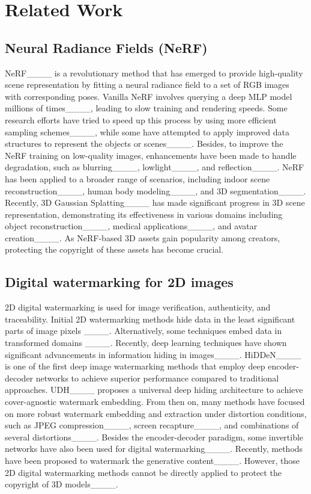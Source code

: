 \section{Related Work}
\subsection{Neural Radiance Fields (NeRF)}
NeRF____ is a revolutionary method that has emerged to provide high-quality scene representation by fitting a neural radiance field to a set of RGB images with corresponding poses. Vanilla NeRF involves querying a deep MLP model millions of times____, leading to slow training and rendering speeds. Some research efforts have tried to speed up this process by using more efficient sampling schemes____, while some have attempted to apply improved data structures to represent the objects or scenes____. Besides, to improve the NeRF training on low-quality images, enhancements have been made to handle degradation, such as blurring____, lowlight____, and reflection____. NeRF has been applied to a broader range of scenarios, including indoor scene reconstruction____, human body modeling____, and 3D segmentation____. Recently, 3D Gaussian Splatting____ has made significant progress in 3D scene representation, demonstrating its effectiveness in various domains including object reconstruction____, medical applications____, and avatar creation____. 
As NeRF-based 3D assets gain popularity among creators, protecting the copyright of these assets has become crucial.


\subsection{Digital watermarking for 2D images} 
2D digital watermarking is used for image verification, authenticity, and traceability. Initial 2D watermarking methods hide data in the least significant parts of image pixels ____. Alternatively, some techniques embed data in transformed domains ____. Recently, deep learning techniques have shown significant advancements in information hiding in images____. HiDDeN____ is one of the first deep image watermarking methods that employ deep encoder-decoder networks to achieve superior performance compared to traditional approaches. UDH____ proposes a universal deep hiding architecture to achieve cover-agnostic watermark embedding. From then on, many methods have focused on more robust watermark embedding and extraction under distortion conditions, such as JPEG compression____, screen recapture____, and combinations of several distortions____. Besides the encoder-decoder paradigm, some invertible networks have also been used for digital watermarking____. Recently, methods have been proposed to watermark the generative content____. However, those 2D digital watermarking methods cannot be directly applied to protect the copyright of 3D models____.

